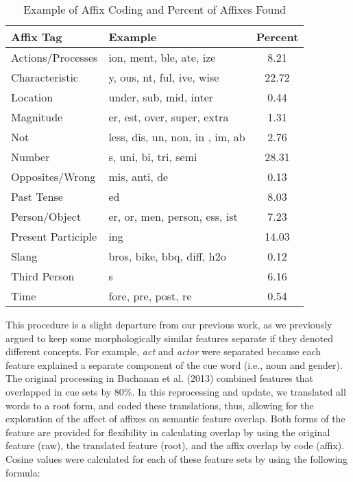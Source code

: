 \documentclass[english,man]{apa6}
\theoremstyle{definition}
\theoremstyle{definition}
\theoremstyle{definition}
\theoremstyle{remark}
\begin{document}
\begin{table}[tbp]
\begin{center}
\begin{threeparttable}
\caption{\label{tab:affix-table}Example of Affix Coding and Percent of Affixes Found}
\begin{tabular}{llc}
\toprule
Affix Tag & Example & Percent\\
\midrule
Actions/Processes & ion, ment, ble, ate, ize & 8.21\\
Characteristic & y, ous, nt, ful, ive, wise & 22.72\\
Location & under, sub, mid, inter & 0.44\\
Magnitude & er, est, over, super, extra & 1.31\\
Not & less, dis, un, non, in , im, ab & 2.76\\
Number & s, uni, bi, tri, semi & 28.31\\
Opposites/Wrong & mis, anti, de & 0.13\\
Past Tense & ed & 8.03\\
Person/Object & er, or, men, person, ess, ist & 7.23\\
Present Participle & ing & 14.03\\
Slang & bros, bike, bbq, diff, h2o & 0.12\\
Third Person & s & 6.16\\
Time & fore, pre, post, re & 0.54\\
\bottomrule
\end{tabular}
\end{threeparttable}
\end{center}
\end{table}

This procedure is a slight departure from our previous work, as we
previously argued to keep some morphologically similar features separate
if they denoted different concepts. For example, \emph{act} and
\emph{actor} were separated because each feature explained a separate
component of the cue word (i.e., noun and gender). The original
processing in Buchanan et al. (2013) combined features that overlapped
in cue sets by 80\%. In this reprocessing and update, we translated all
words to a root form, and coded these translations, thus, allowing for
the exploration of the affect of affixes on semantic feature overlap.
Both forms of the feature are provided for flexibility in calculating
overlap by using the original feature (raw), the translated feature
(root), and the affix overlap by code (affix). Cosine values were
calculated for each of these feature sets by using the following
formula:
\end{document}
